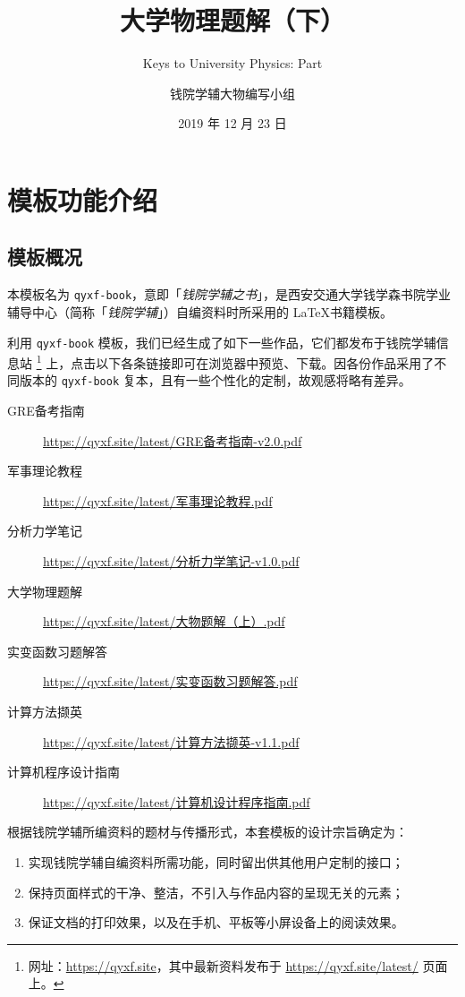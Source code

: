 \documentclass[
  xits = false,
  10pt,
  twoside,
  openany,
  b5paper, %
  colorscheme = basic %
]{qyxf-book}
\title{大学物理题解（下）}
\subtitle{Keys to University Physics: Part \RNum{2}}
\author{钱院学辅大物编写小组}
\date{2019 年 12 月 23 日}
\begin{document}


\chapter{模板功能介绍}

\section{模板概况}

本模板名为 \verb|qyxf-book|，意即「\emph{钱院学辅之书}」，是西安交通大学钱学森书院学业辅导中心（简称「\emph{钱院学辅}」）自编资料时所采用的 \LaTeX 书籍模板。

利用 \verb|qyxf-book| 模板，我们已经生成了如下一些作品，它们都发布于钱院学辅信息站
\footnote{网址：\url{https://qyxf.site}，其中最新资料发布于 \url{https://qyxf.site/latest/} 页面上。}
上，点击以下各条链接即可在浏览器中预览、下载。因各份作品采用了不同版本的 \verb|qyxf-book| 复本，且有一些个性化的定制，故观感将略有差异。

\begin{tcolorbox}
  \begin{description}
    \item [GRE备考指南] \url{https://qyxf.site/latest/GRE备考指南-v2.0.pdf}
    \item [军事理论教程] \url{https://qyxf.site/latest/军事理论教程.pdf}
    \item [分析力学笔记] \url{https://qyxf.site/latest/分析力学笔记-v1.0.pdf}
    \item [大学物理题解] \url{https://qyxf.site/latest/大物题解（上）.pdf}
    \item [实变函数习题解答] \url{https://qyxf.site/latest/实变函数习题解答.pdf}
    \item [计算方法撷英] \url{https://qyxf.site/latest/计算方法撷英-v1.1.pdf}
    \item [计算机程序设计指南] \url{https://qyxf.site/latest/计算机设计程序指南.pdf}
  \end{description}
\end{tcolorbox}

根据钱院学辅所编资料的题材与传播形式，本套模板的设计宗旨确定为：
\begin{enumerate}
  \item 实现钱院学辅自编资料所需功能，同时留出供其他用户定制的接口；
  \item 保持页面样式的干净、整洁，不引入与作品内容的呈现无关的元素；
  \item 保证文档的打印效果，以及在手机、平板等小屏设备上的阅读效果。
\end{enumerate}
\end{document}
